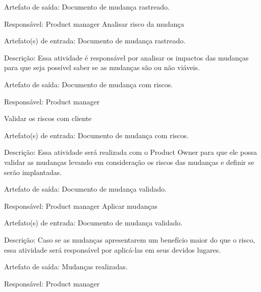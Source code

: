 Artefato de saída: Documento de mudança rastreado.

Responsável: Product manager
Analisar risco da mudança

Artefato(s) de entrada: Documento de mudança rastreado.

Descrição: Essa atividade é responsável por analisar os impactos das mudanças para que seja possível saber se as mudanças são ou não viáveis.

Artefato de saída: Documento de mudança com riscos.

Responsável: Product manager

Validar os riscos com cliente

Artefato(s) de entrada: Documento de mudança com riscos. 

Descrição: Essa atividade será realizada com o Product Owner para que ele possa validar as mudanças levando em consideração os riscos das mudanças e definir se serão implantadas.

Artefato de saída: Documento de mudança validado.

Responsável: Product manager
Aplicar mudanças

Artefato(s) de entrada: Documento de mudança validado.

Descrição: Caso se as mudanças apresentarem um benefício maior do que o risco, essa atividade será responsável por aplicá-las em seus devidos lugares.

Artefato de saída: Mudanças realizadas.

Responsável: Product manager
